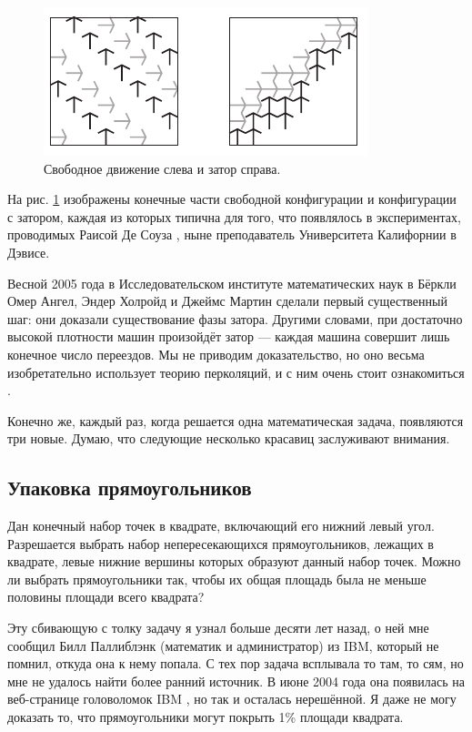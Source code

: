 \begin{figure}[htb!]
\centering
\includegraphics[scale=1]{pics/gridlock}
\caption{Свободное движение слева и затор справа.}
\label{pic:gridlock}
\end{figure}

На рис. \ref{pic:gridlock} изображены конечные части свободной конфигурации и конфигурации с затором, каждая из которых типична для того, что появлялось в экспериментах, проводимых Раисой Де Соуза \cite{15}, ныне преподаватель Университета Калифорнии в Дэвисе.

Весной 2005 года в Исследовательском институте математических наук в Бёркли Омер Ангел, Эндер Холройд и Джеймс Мартин сделали первый существенный шаг: они доказали существование фазы затора.
Другими словами, при достаточно высокой плотности машин произойдёт затор --- каждая машина совершит лишь конечное число переездов.
Мы не приводим доказательство, но оно весьма изобретательно использует теорию перколяций, и с ним очень стоит ознакомиться \cite{2}.

Конечно же, каждый раз, когда решается одна математическая задача, появляются три новые.
Думаю, что следующие несколько красавиц заслуживают внимания.

\subsection*{Упаковка прямоугольников}

Дан конечный набор точек в квадрате, включающий его нижний левый угол.
Разрешается выбрать набор непересекающихся прямоугольников, лежащих в квадрате, левые нижние вершины которых образуют данный набор точек.
Можно ли выбрать прямоугольники так, чтобы их общая площадь была не меньше половины площади всего квадрата?

\medskip

Эту сбивающую с толку задачу я узнал больше десяти лет назад,
о ней мне сообщил Билл Паллиблэнк (математик и администратор) из IBM, который не помнил, откуда она к нему попала.
С тех пор задача всплывала то там, то сям, но мне не удалось найти более ранний источник.
В июне 2004 года она появилась на веб-странице головоломок IBM \cite{ponder-this}, но так и осталась нерешённой.
Я даже не могу доказать то, что прямоугольники могут покрыть 1\% площади квадрата.

